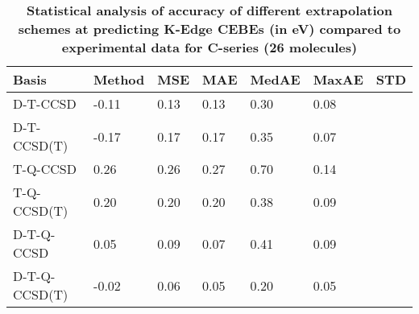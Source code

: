\begin{table}
  \caption{\textbf{Statistical analysis of accuracy of different extrapolation schemes at predicting K-Edge CEBEs (in eV) compared to experimental data for C-series (26 molecules)}}
  \begin{tabular}{l l l l l l l }
    \toprule
    \textbf{Basis} & \textbf{Method} & \textbf{MSE} & \textbf{MAE} & \textbf{MedAE} & \textbf{MaxAE} & \textbf{STD} \\ 
    \midrule
    D-T-CCSD & -0.11 & 0.13 & 0.13 & 0.30 & 0.08 \\ 
    D-T-CCSD(T) & -0.17 & 0.17 & 0.17 & 0.35 & 0.07 \\ 
    T-Q-CCSD & 0.26 & 0.26 & 0.27 & 0.70 & 0.14 \\ 
    T-Q-CCSD(T) & 0.20 & 0.20 & 0.20 & 0.38 & 0.09 \\ 
    D-T-Q-CCSD & 0.05 & 0.09 & 0.07 & 0.41 & 0.09 \\ 
    D-T-Q-CCSD(T) & -0.02 & 0.06 & 0.05 & 0.20 & 0.05 \\ 
    \bottomrule
  \end{tabular}
\end{table}

